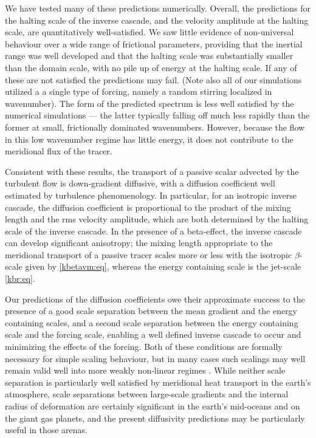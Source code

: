 \documentclass{jfm}
\newcommand{\eg}  {\textit{e.g., }}
\begin{document}
We have tested many of these predictions numerically. Overall, the
predictions for the halting scale of the inverse cascade, and the
velocity amplitude at the halting scale, are quantitatively
well-satisfied. We saw little evidence of non-universal behaviour over
a wide range of frictional parameters, providing that the inertial
range was well developed and that the halting scale was substantially
smaller than the domain scale, with no pile up of energy at the
halting scale. If any of these are not satisfied the predictions may
fail. (Note also all of our simulations utilized a a single type of
forcing, namely a random stirring localized in wavenumber).  The form
of the predicted spectrum is less well satisfied by the numerical
simulations --- the latter typically falling off much less rapidly
than the former at small, frictionally dominated wavenumbers. However,
because the flow in this low wavenumber regime has little energy, it
does not contribute to the meridional flux of the tracer.

Consistent with these results, the transport of a passive scalar
advected by the turbulent flow is down-gradient diffusive, with a
diffusion coefficient well estimated by turbulence phenomenology.  In
particular, for an isotropic inverse cascade, the diffusion
coefficient is proportional to the product of the mixing length and
the rms velocity amplitude, which are both determined by the halting
scale of the inverse cascade.  In the presence of a beta-effect, the
inverse cascade can develop significant anisotropy; the mixing length
appropriate to the meridional transport of a passive tracer scales
more or less with the isotropic $\beta$-scale given by
\eqref{kbetavm:eq}, whereas the energy containing scale is the
jet-scale \eqref{kbr:eq}.

Our predictions of the diffusion coefficients owe their approximate
success to the presence of a good scale separation between the mean
gradient and the energy containing scales, and a second scale
separation between the energy containing scale and the forcing scale,
enabling a well defined inverse cascade to occur and minimizing the
effects of the forcing.  Both of these conditions are formally
necessary for simple scaling behaviour, but in many cases such
scalings may well remain valid well into more weakly non-linear
regimes \citep[\eg][]{Held96}.  While neither scale separation is
particularly well satisfied by meridional heat transport in the
earth's atmosphere, scale separations between large-scale gradients
and the internal radius of deformation are certainly significant in
the earth's mid-oceans and on the giant gas planets, and the present
diffusivity predictions may be particularly useful in those arenas.
\end{document}

